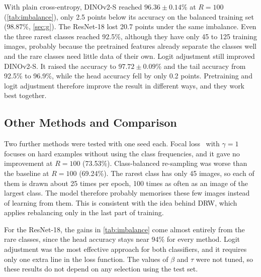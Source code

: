 \documentclass[11pt,a4paper]{article}
\renewcommand{\thesection}{(\alph{section})}
\newcommand{\pct}[1]{#1\%}
\newcommand{\pmpct}[2]{$#1 \pm #2$\%}
\begin{document}
With plain cross-entropy, DINOv2-S reached \pmpct{96.36}{0.14} at $R = 100$ (\cref{tab:imbalance}), only 2.5 points below its accuracy on the balanced training set (\pct{98.87}, \cref{sec:g}). The ResNet-18 lost 20.7 points under the same imbalance. Even the three rarest classes reached \pct{92.5}, although they have only 45 to 125 training images, probably because the pretrained features already separate the classes well and the rare classes need little data of their own. Logit adjustment still improved DINOv2-S. It raised the accuracy to \pmpct{97.72}{0.09} and the tail accuracy from \pct{92.5} to \pct{96.9}, while the head accuracy fell by only 0.2 points. Pretraining and logit adjustment therefore improve the result in different ways, and they work best together.

\subsection*{Other Methods and Comparison}

Two further methods were tested with one seed each. Focal loss~\cite{lin2017focal} with $\gamma = 1$ focuses on hard examples without using the class frequencies, and it gave no improvement at $R = 100$ (\pct{73.53}). Class-balanced re-sampling was worse than the baseline at $R = 100$ (\pct{69.24}). The rarest class has only 45 images, so each of them is drawn about 25 times per epoch, 100 times as often as an image of the largest class. The model therefore probably memorises these few images instead of learning from them. This is consistent with the idea behind DRW, which applies rebalancing only in the last part of training.

For the ResNet-18, the gains in \cref{tab:imbalance} come almost entirely from the rare classes, since the head accuracy stays near \pct{94} for every method. Logit adjustment was the most effective approach for both classifiers, and it requires only one extra line in the loss function. The values of $\beta$ and $\tau$ were not tuned, so these results do not depend on any selection using the test set.

\clearpage
{}
{}



\clearpage
\appendix
\renewcommand{\thesection}{\Alph{section}}
\end{document}
